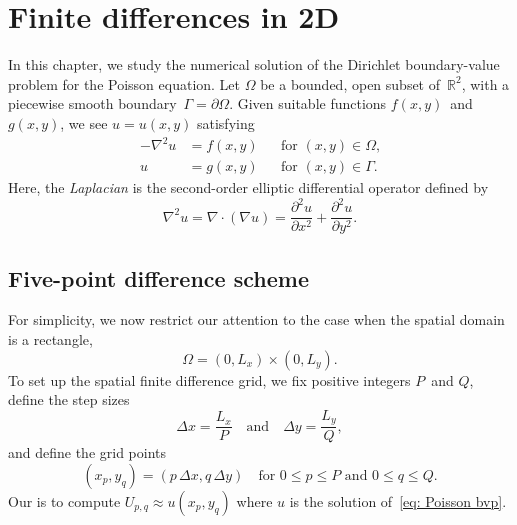 \chapter{Finite differences in 2D}\label{chap: finite diff 2d}

In this chapter, we study the numerical solution of the Dirichlet boundary-value 
problem for the Poisson equation. Let $\Omega$ be a bounded, open subset 
of~$\mathbb{R}^2$, with a piecewise smooth boundary~$\Gamma=\partial\Omega$.  
Given suitable functions $f(x,y)$~and $g(x,y)$, we see $u=u(x,y)$ satisfying
\begin{equation}\label{eq: Poisson bvp}
\begin{aligned}
-\nabla^2u&=f(x,y)&&\text{for $(x,y)\in\Omega$,}\\
u&=g(x,y)&&\text{for $(x,y)\in\Gamma$.}
\end{aligned}
\end{equation}
Here, the \emph{Laplacian} is the second-order elliptic differential operator
defined by
\[
\nabla^2 u=\nabla\cdot(\nabla u)=\frac{\partial^2u}{\partial x^2}
    +\frac{\partial^2u}{\partial y^2}.
\]

\section{Five-point difference scheme}\label{sec: five point scheme}
For simplicity, we now restrict our attention to the case when the spatial 
domain is a rectangle,
\begin{equation}\label{eq: Omega rectangle}
\Omega=(0,L_x)\times(0,L_y).
\end{equation}
To set up the spatial finite difference grid, we fix positive integers $P$~and 
$Q$, define the step sizes
\[
\Delta x=\frac{L_x}{P}\quad\text{and}\quad\Delta y=\frac{L_y}{Q},
\]
and define the grid points
\begin{equation}\label{eq: xp yq grid}
(x_p,y_q)=(p\,\Delta x,q\,\Delta y)
\quad\text{for $0\le p\le P$ and $0\le q\le Q$.}
\end{equation}
Our is to compute $U_{p,q}\approx u(x_p,y_q)$ where $u$ is the solution 
of~\eqref{eq: Poisson bvp}.

